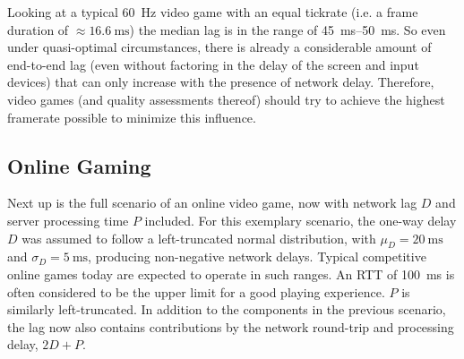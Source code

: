 Looking at a typical \SI{60}{\hertz} video game with an equal tickrate (i.e. a frame duration of $\approx \SI{16.6}{\milli\second}$) the median lag is in the range of \SIrange{45}{50}{\milli\second}. So even under quasi-optimal circumstances, there is already a considerable amount of end-to-end lag (even without factoring in the delay of the screen and input devices) that can only increase with the presence of network delay. Therefore, video games (and quality assessments thereof) should try to achieve the highest framerate possible to minimize this influence.

\subsection{Online Gaming}

Next up is the full scenario of an online video game, now with network lag $D$ and server processing time $P$ included. For this exemplary scenario, the one-way delay $D$ was assumed to follow a left-truncated normal distribution, with $\mu_D = \SI{20}{\milli\second}$ and $\sigma_D = \SI{5}{\milli\second}$, producing non-negative network delays. Typical competitive online games today are expected to operate in such ranges. An \acrshort{RTT} of \SI{100}{\milli\second} is often considered to be the upper limit for a good playing experience. $P$ is similarly left-truncated. In addition to the components in the previous scenario, the lag now also contains contributions by the network round-trip and processing delay, $2D + P$.

